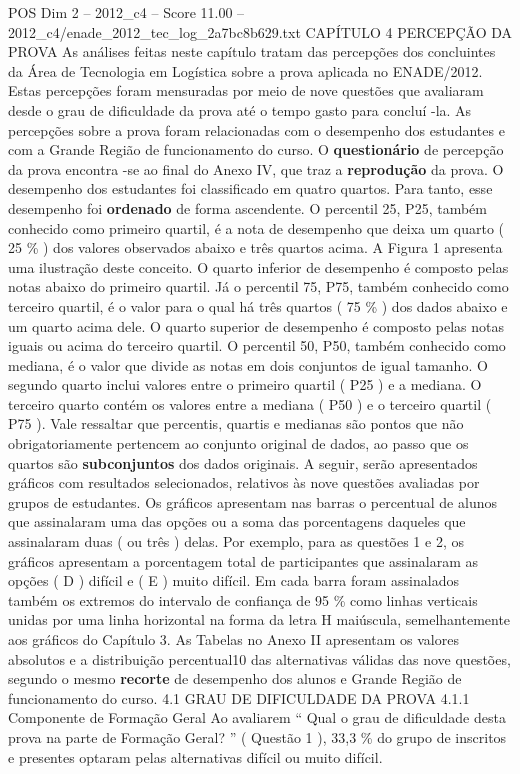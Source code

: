 \begin{textsample}{POS Dim 2 – 2012\_c4 – Score 11.00 – 2012\_c4/enade\_2012\_tec\_log\_2a7bc8b629.txt}  \label{ex:f2_pos_108}
CAPÍTULO 4 PERCEPÇÃO DA PROVA As análises feitas neste capítulo tratam das percepções dos concluintes da Área de Tecnologia em Logística sobre a prova aplicada no ENADE/2012.
Estas percepções foram mensuradas por meio de nove questões que avaliaram desde o grau de dificuldade da prova até o tempo gasto para concluí -la.
As percepções sobre a prova foram relacionadas com o desempenho dos estudantes e com a Grande Região de funcionamento do curso.
O \textbf{questionário} de percepção da prova encontra -se ao final do Anexo IV, que traz a \textbf{reprodução} da prova.
O desempenho dos estudantes foi classificado em quatro quartos.
Para tanto, esse desempenho foi \textbf{ordenado} de forma ascendente.
O percentil 25, P25, também conhecido como primeiro quartil, é a nota de desempenho que deixa um quarto ( 25 \% ) dos valores observados abaixo e três quartos acima.
A Figura 1 apresenta uma ilustração deste conceito.
O quarto inferior de desempenho é composto pelas notas abaixo do primeiro quartil.
Já o percentil 75, P75, também conhecido como terceiro quartil, é o valor para o qual há três quartos ( 75 \% ) dos dados abaixo e um quarto acima dele.
O quarto superior de desempenho é composto pelas notas iguais ou acima do terceiro quartil.
O percentil 50, P50, também conhecido como mediana, é o valor que divide as notas em dois conjuntos de igual tamanho.
O segundo quarto inclui valores entre o primeiro quartil ( P25 ) e a mediana.
O terceiro quarto contém os valores entre a mediana ( P50 ) e o terceiro quartil ( P75 ).
Vale ressaltar que percentis, quartis e medianas são pontos que não obrigatoriamente pertencem ao conjunto original de dados, ao passo que os quartos são \textbf{subconjuntos} dos dados originais.
A seguir, serão apresentados gráficos com resultados selecionados, relativos às nove questões avaliadas por grupos de estudantes.
Os gráficos apresentam nas barras o percentual de alunos que assinalaram uma das opções ou a soma das porcentagens daqueles que assinalaram duas ( ou três ) delas.
Por exemplo, para as questões 1 e 2, os gráficos apresentam a porcentagem total de participantes que assinalaram as opções ( D ) difícil e ( E ) muito difícil.
Em cada barra foram assinalados também os extremos do intervalo de confiança de 95 \% como linhas verticais unidas por uma linha horizontal na forma da letra H maiúscula, semelhantemente aos gráficos do Capítulo 3.
As Tabelas no Anexo II apresentam os valores absolutos e a distribuição percentual10 das alternativas válidas das nove questões, segundo o mesmo \textbf{recorte} de desempenho dos alunos e Grande Região de funcionamento do curso. 4.1 GRAU DE DIFICULDADE DA PROVA 4.1.1 Componente de Formação Geral Ao avaliarem “ Qual o grau de dificuldade desta prova na parte de Formação Geral? ” ( Questão 1 ), 33,3 \% do grupo de inscritos e presentes optaram pelas alternativas difícil ou muito difícil.

\end{textsample}
